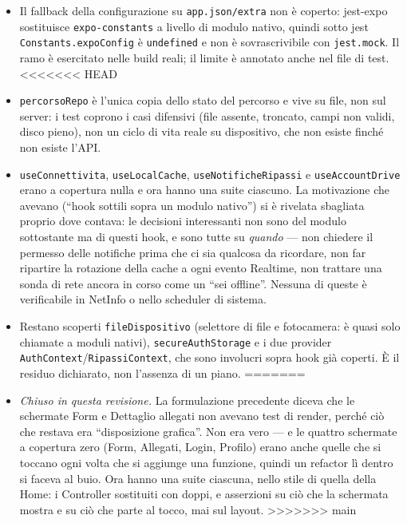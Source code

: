 \documentclass[11pt,a4paper]{report}
\begin{document}
\begin{itemize}[nosep]
        \`E stato lo scrivere quei test a far emergere un difetto reale: la
        guardia CSRF richiedeva che lo \texttt{state} fosse presente
        \emph{sia} nel redirect \emph{sia} nel record salvato, quindi un
        redirect che semplicemente non ne portava nessuno saltava il
        controllo --- cio\`e esattamente ci\`o che farebbe chi sceglie che
        cosa mandare. Ora la condizione guarda solo lo \texttt{state} salvato.
  \item Il fallback della configurazione su \texttt{app.json/extra} non \`e
        coperto: jest-expo sostituisce \texttt{expo-constants} a livello di
        modulo nativo, quindi sotto jest \texttt{Constants.expoConfig} \`e
        \texttt{undefined} e non \`e sovrascrivibile con \texttt{jest.mock}. Il
        ramo \`e esercitato nelle build reali; il limite \`e annotato anche nel
        file di test.
<<<<<<< HEAD
  \item \texttt{percorsoRepo} \`e l'unica copia dello stato del percorso e
        vive su file, non sul server: i test coprono i casi difensivi (file
        assente, troncato, campi non validi, disco pieno), non un ciclo di vita
        reale su dispositivo, che non esiste finch\'e non esiste l'API.
  \item \texttt{useConnettivita}, \texttt{useLocalCache},
        \texttt{useNotificheRipassi} e \texttt{useAccountDrive} erano a
        copertura nulla e ora hanno una suite ciascuno. La motivazione che
        avevano (``hook sottili sopra un modulo nativo'') si \`e rivelata
        sbagliata proprio dove contava: le decisioni interessanti non sono del
        modulo sottostante ma di questi hook, e sono tutte su \emph{quando}
        --- non chiedere il permesso delle notifiche prima che ci sia qualcosa
        da ricordare, non far ripartire la rotazione della cache a ogni evento
        Realtime, non trattare una sonda di rete ancora in corso come un
        ``sei offline''. Nessuna di queste \`e verificabile in NetInfo o nello
        scheduler di sistema.
  \item Restano scoperti \texttt{fileDispositivo} (selettore di file e
        fotocamera: \`e quasi solo chiamate a moduli nativi),
        \texttt{secureAuthStorage} e i due provider
        \texttt{AuthContext}/\texttt{RipassiContext}, che sono involucri sopra
        hook gi\`a coperti. \`E il residuo dichiarato, non l'assenza di un
        piano.
=======
  \item \emph{Chiuso in questa revisione.} La formulazione precedente diceva
        che le schermate Form e Dettaglio allegati non avevano test di render,
        perch\'e ci\`o che restava era ``disposizione grafica''. Non era vero
        --- e le quattro schermate a copertura zero (Form, Allegati, Login,
        Profilo) erano anche quelle che si toccano ogni volta che si aggiunge
        una funzione, quindi un refactor l\`i dentro si faceva al buio. Ora
        hanno una suite ciascuna, nello stile di quella della Home: i
        Controller sostituiti con doppi, e asserzioni su ci\`o che la schermata
        mostra e su ci\`o che parte al tocco, mai sul layout.
>>>>>>> main
\end{itemize}
\end{document}
